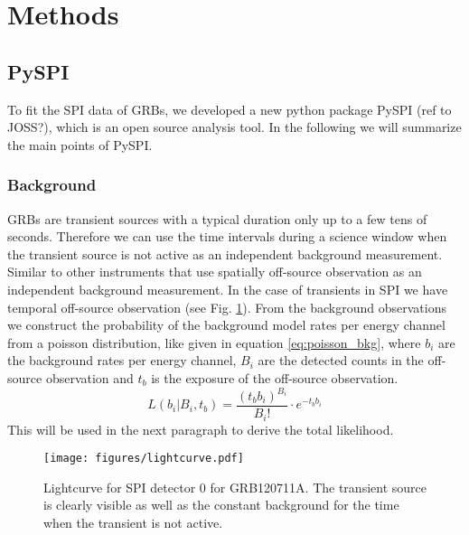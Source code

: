 \documentclass[modern]{aastex631}
\begin{document}
\section{Methods}
\subsection{PySPI}
\label{pyspi}
To fit the SPI data of GRBs, we developed a new python package PySPI (ref to JOSS?), which is an open source analysis tool. In the following we will summarize the main points of PySPI.

\subsubsection*{Background}

GRBs are transient sources with a typical duration only up to a few tens of seconds.
Therefore we can use the time intervals during a science window when the transient source is not active as an independent background measurement. Similar to other instruments that use spatially off-source observation as an independent background measurement. In the case of transients in SPI we have temporal off-source observation (see Fig. \ref{fig:lightcurve}). From the background observations we construct the probability of the background model rates per energy channel from a poisson distribution, like given in equation \ref{eq:poisson_bkg}, where $b_{i}$ are the background rates per energy channel, $B_{i}$ are the detected counts in the off-source observation and $t_{b}$ is the exposure of the off-source observation.
\begin{equation}
	L(b_{i}|B_{i}, t_{b})=\frac{(t_{b} b_{i})^{B_{i}}}{B_{i}!}\cdot e^{-t_{b} b_{i}}
  \label{eq:poisson_bkg}
\end{equation}
This will be used in the next paragraph to derive the total likelihood.

\begin{figure}
    \begin{centering}
        \texttt{[image: figures/lightcurve.pdf]}
        \caption{Lightcurve for SPI detector 0 for GRB120711A. The transient source is clearly visible as well as the constant background for the time when the transient is not active.}
        \label{fig:lightcurve}
    \end{centering}
\end{figure}
\end{document}
